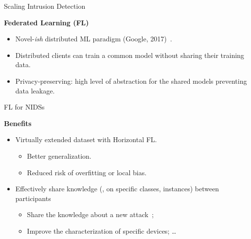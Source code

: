 \begin{frame}{Scaling Intrusion Detection}

  \textbf{Federated Learning (FL)}
  
  \begin{itemize}[<+->]
    \item Novel-\emph{ish} distributed ML paradigm (Google, 2017)~\cite{mcmahan_Communicationefficientlearningdeep_2017}.
    \item Distributed clients can train a common model without sharing their training data.
    \item \alert{Privacy-preserving}: high level of abstraction for the shared models preventing data leakage.
  \end{itemize}
\end{frame}


\begin{frame}{FL for NIDSs}

  \textbf{Benefits}
  \begin{itemize}[<+->]
    \item Virtually extended dataset with Horizontal FL.
    \begin{itemize}[<1->]
      \item Better generalization.
      \item Reduced risk of overfitting or local bias.
    \end{itemize}
    

    \item Effectively share knowledge (\eg, on specific classes, instances) between participants
    \begin{itemize}[<1->]
      \item Share the knowledge about a new attack~\autocite{lavaur_icdcs_demo_2024};
      \item Improve the characterization of specific devices; \dots
    \end{itemize}


  \end{itemize}
\end{frame}

